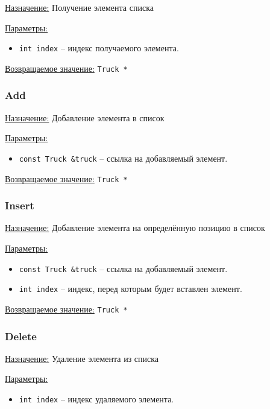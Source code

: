 \underline{Назначение:} Получение элемента списка

\underline{Параметры:} 

\begin{itemize}
    \item \verb|int index| -- индекс получаемого элемента.
\end{itemize}

\underline{Возвращаемое значение:} \verb|Truck *|


\subsubsection*{Add}

\underline{Назначение:} Добавление элемента в список

\underline{Параметры:} 

\begin{itemize}
    \item \verb|const Truck &truck| -- ссылка на добавляемый элемент.
\end{itemize}

\underline{Возвращаемое значение:} \verb|Truck *|


\subsubsection*{Insert}

\underline{Назначение:} Добавление элемента на определённую позицию в список

\underline{Параметры:} 

\begin{itemize}
    \item \verb|const Truck &truck| -- ссылка на добавляемый элемент.
    \item \verb|int index| -- индекс, перед которым будет вставлен элемент.
\end{itemize}

\underline{Возвращаемое значение:} \verb|Truck *|


\subsubsection*{Delete}

\underline{Назначение:} Удаление элемента из списка

\underline{Параметры:} 

\begin{itemize}
    \item \verb|int index| -- индекс удаляемого элемента.
\end{itemize}

